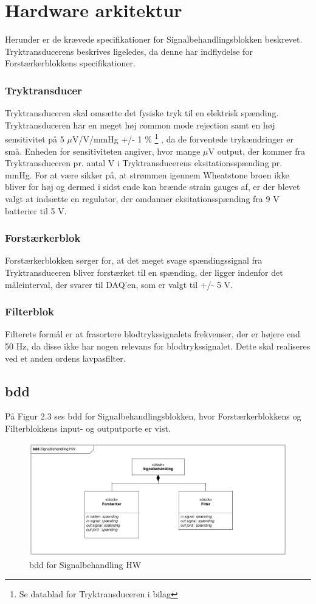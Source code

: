\section{Hardware arkitektur}
Herunder er de krævede specifikationer for Signalbehandlingsblokken beskrevet. Tryktransducerens beskrives ligeledes, da denne har indflydelse for Forstærkerblokkens specifikationer. 

\subsubsection{Tryktransducer}
Tryktransduceren skal omsætte det fysiske tryk til en elektrisk spænding. Tryktransduceren har en meget høj common mode rejection samt en høj sensitivitet på 5 $\mu$V/V/mmHg +/- 1 \% \footnote{Se datablad for Tryktransduceren i bilag} , da de forventede trykændringer er små. Enheden for sensitiviteten angiver, hvor mange $\mu$V output, der kommer fra Tryktransduceren pr. antal V i Tryktransducerens eksitationsspænding pr. mmHg. For at være sikker på, at strømmen igennem Wheatstone broen ikke bliver for høj og dermed i sidst ende kan brænde strain gauges af, er der blevet valgt at indsætte en regulator, der omdanner eksitationsspænding fra 9 V batterier til 5 V. 

\subsubsection{Forstærkerblok}
Forstærkerblokken sørger for, at det meget svage spændingssignal fra Tryktransduceren bliver forstærket til en spænding, der ligger indenfor det måleinterval, der svarer til DAQ'en, som er valgt til +/- 5 V.
 
\subsubsection{Filterblok}
Filterets formål er at frasortere blodtrykssignalets frekvenser, der er højere end 50 Hz, da disse ikke har nogen relevans for blodtrykssignalet. Dette skal realiseres ved et anden ordens lavpasfilter. 
 
\subsection{bdd}
På Figur 2.3 ses bdd for Signalbehandlingsblokken, hvor Forstærkerblokkens og Filterblokkens input- og outputporte er vist.  
\begin{figure}[H]
	\centering
	\includegraphics[width=1\textwidth]{Figurer/4}
	\caption{bdd for Signalbehandling HW}
	\label{fig:bdd hw}
\end{figure}

